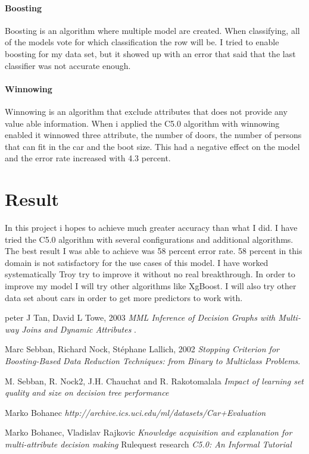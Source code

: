 \documentclass[a4paper, 12pt]{article}
\begin{document}
\paragraph{Boosting}
Boosting is an algorithm where multiple model are created. When classifying, all of the models vote for which classification the row will be. I tried to enable boosting for my data set, but it showed up with an error that said that the last classifier was not accurate enough.

\paragraph{Winnowing}
Winnowing is an algorithm that exclude attributes that does not provide any value able information. When i applied the C5.0 algorithm with winnowing enabled it winnowed three attribute, the number of doors, the number of persons that can fit in the car and the boot size. This had a negative effect on the model and the error rate increased with 4.3 percent.


\section{Result}
In this project i hopes to achieve much greater accuracy than what I did. I have tried the C5.0 algorithm with several configurations and additional algorithms. The best result I was able to achieve was 58 percent error rate. 58 percent in this domain is not satisfactory for the use cases of this model. I have worked systematically Troy try to improve it without no real breakthrough. In order to improve my model I will try other algorithms like XgBoost. I will also try other data set about cars in order to get more predictors to work with. 
\clearpage
\begin{thebibliography}{9}
peter J Tan, David L Towe, 2003
\textit{MML Inference of Decision Graphs with Multi-way Joins and Dynamic Attributes
}.

  Marc Sebban, Richard Nock, Stéphane Lallich, 2002
  \textit{Stopping Criterion for Boosting-Based Data Reduction Techniques: from Binary to Multiclass Problems}.

  M. Sebban, R. Nock2, J.H. Chauchat and R. Rakotomalala
  \textit{Impact of learning set quality and size on decision tree performance}

  Marko Bohanec
  \textit{http://archive.ics.uci.edu/ml/datasets/Car+Evaluation}

  Marko Bohanec, Vladislav Rajkovic
  \textit{Knowledge acquisition and explanation for multi-attribute decision making}
  Rulequest research
  \textit{C5.0: An Informal Tutorial}


 
\end{thebibliography}
\end{document}
